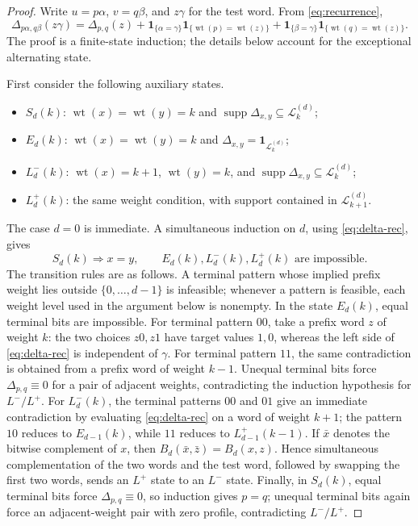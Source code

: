 \documentclass[11pt]{article}
\theoremstyle{definition}
\newcommand{\wt}{\operatorname{wt}}
\newcommand{\supp}{\operatorname{supp}}
\newcommand{\ind}[1]{\mathbf 1_{\{#1\}}}
\newcommand{\cL}{\mathcal L}
\begin{document}
\begin{proof}
Write $u=p\alpha$, $v=q\beta$, and $z\gamma$ for the test word.  From \eqref{eq:recurrence},
\begin{equation}\label{eq:delta-rec}
 \Delta_{p\alpha,q\beta}(z\gamma)
 =\Delta_{p,q}(z)
 +\ind{\alpha=\gamma}\ind{\wt(p)=\wt(z)}
 +\ind{\beta=\gamma}\ind{\wt(q)=\wt(z)}.
\end{equation}
The proof is a finite-state induction; the details below account for the exceptional alternating state.

First consider the following auxiliary states.
\begin{itemize}[leftmargin=2em]
 \item $S_d(k)$: $\wt(x)=\wt(y)=k$ and $\supp\Delta_{x,y}\subseteq\cL_k^{(d)}$;
 \item $E_d(k)$: $\wt(x)=\wt(y)=k$ and $\Delta_{x,y}=\mathbf 1_{\cL_k^{(d)}}$;
 \item $L_d^-(k)$: $\wt(x)=k+1$, $\wt(y)=k$, and $\supp\Delta_{x,y}\subseteq\cL_k^{(d)}$;
 \item $L_d^+(k)$: the same weight condition, with support contained in $\cL_{k+1}^{(d)}$.
\end{itemize}
The case $d=0$ is immediate.  A simultaneous induction on $d$, using \eqref{eq:delta-rec}, gives
\begin{equation}\label{eq:auxstates}
 S_d(k)\Longrightarrow x=y,
 \qquad E_d(k),L_d^-(k),L_d^+(k)\text{ are impossible.}
\end{equation}
The transition rules are as follows.  A terminal pattern whose implied prefix weight lies outside $\{0,\ldots,d-1\}$ is infeasible; whenever a pattern is feasible, each weight level used in the argument below is nonempty.  In the state $E_d(k)$, equal terminal bits are impossible.  For terminal pattern $00$, take a prefix word $z$ of weight $k$: the two choices $z0,z1$ have target values $1,0$, whereas the left side of \eqref{eq:delta-rec} is independent of $\gamma$.  For terminal pattern $11$, the same contradiction is obtained from a prefix word of weight $k-1$.  Unequal terminal bits force $\Delta_{p,q}\equiv0$ for a pair of adjacent weights, contradicting the induction hypothesis for $L^-\!/L^+$.  For $L_d^-(k)$, the terminal patterns $00$ and $01$ give an immediate contradiction by evaluating \eqref{eq:delta-rec} on a word of weight $k+1$; the pattern $10$ reduces to $E_{d-1}(k)$, while $11$ reduces to $L_{d-1}^+(k-1)$.  If $\bar x$ denotes the bitwise complement of $x$, then
$B_d(\bar x,\bar z)=B_d(x,z)$.  Hence simultaneous complementation of the two words and the test word, followed by swapping the first two words, sends an $L^+$ state to an $L^-$ state.  Finally, in $S_d(k)$, equal terminal bits force $\Delta_{p,q}\equiv0$, so induction gives $p=q$; unequal terminal bits again force an adjacent-weight pair with zero profile, contradicting $L^-\!/L^+$.


\end{proof}
\end{document}
